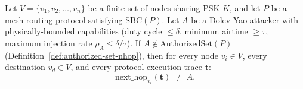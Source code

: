 
\begin{theorem}
\label{thm:sbc-multihop}
Let $V = \{v_1, v_2, \ldots, v_n\}$ be a finite set of nodes sharing
PSK $K$, and let $P$ be a mesh routing protocol satisfying
$\mathrm{SBC}(P)$.
Let $A$ be a Dolev-Yao attacker with physically-bounded capabilities
(duty cycle $\le \delta$, minimum airtime $\ge \tau$, maximum injection
rate $\rho_A \le \delta/\tau$).
If $A \notin \mathrm{AuthorizedSet}(P)$
(Definition~\ref{def:authorized-set-nhop}), then for every node
$v_i \in V$, every destination $v_d \in V$, and every protocol
execution trace $\mathbf{t}$:
\[
  \mathrm{next\_hop}_{v_i}(\mathbf{t}) \;\neq\; A.
\]
\end{theorem}

